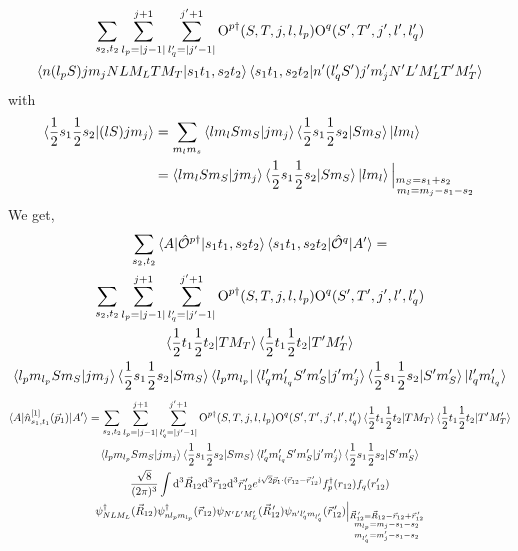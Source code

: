 \documentclass[10pt]{article}
\begin{document}
\begin{multline*}
	 \sum_{s_2,t_2} \sum_{l_p = |j-1|}^{j+1} \sum_{l_q' = |j' - 1|}^{j'+1} \text{O}^{p \dagger}(S,T,j,l,l_p) \text{O}^{q}(S',T',j',l',l_q') \\
	 \braket{ n (l_p S) j m_j N L M_L T M_T | s_1 t_1, s_2 t_2} \braket{ s_1 t_1, s_2 t_2 | n' (l_q' S') j' m_j' N' L' M_L' T' M_T'} \\
\end{multline*}
with
\begin{align*}
	\braket{ \frac{1}{2} s_1 \frac{1}{2} s_2 | (l S) j m_j} &= \sum_{m_l m_s} \braket{ l m_l S m_S | j m_j } \braket{   \frac{1}{2} s_1 \frac{1}{2} s_2 | S m_S} \ket{ l m_l} \\
	&= \braket{ l m_l S m_S | j m_j } \braket{   \frac{1}{2} s_1 \frac{1}{2} s_2 | S m_S} \ket{ l m_l} \Big|_{ \substack{ m_S = s_1 + s_2 \phantom{ + m_j} \\ m_l = m_j - s_1 - s_2} }
\end{align*}
We get,
\begin{multline*}
\sum_{s_2,t_2} \braket{ A | \hat{\mathcal{O}}^{p\dagger} | s_1 t_1, s_2 t_2} \braket{ s_1 t_1, s_2 t_2 | \hat{ \mathcal{O}}^{q} | A'} = \\
 \sum_{s_2,t_2} \sum_{l_p = |j-1|}^{j+1} \sum_{l_q' = |j' - 1|}^{j'+1} \text{O}^{p \dagger}(S,T,j,l,l_p) \text{O}^{q}(S',T',j',l',l_q') \\
 	\braket{ \frac{1}{2} t_1 \frac{1}{2} t_2 | T M_T } \braket{ \frac{1}{2} t_1 \frac{1}{2} t_2 | T' M_T'} \\
	\braket{ l_p  m_{l_p} S m_S | j m_j } \braket{   \frac{1}{2} s_1 \frac{1}{2} s_2 | S m_S} \bra{ l_p m_{l_p} }
	\braket{ l_q' m_{l_q}' S' m_S' | j' m_j' } \braket{   \frac{1}{2} s_1 \frac{1}{2} s_2 | S' m_S'} \ket{ l_q' m_{l_q}'}
\end{multline*}
\begin{multline*}
	\braket{ A | \hat{n}_{s_1,t_1}^{[1]}(\vec{p}_1) | A'} =  \sum_{s_2,t_2} \sum_{l_p = |j-1|}^{j+1} \sum_{l_q' = |j' - 1|}^{j'+1} \text{O}^{p\dagger}(S,T,j,l,l_p) \text{O}^{q}(S',T',j',l',l_q') \braket{ \frac{1}{2} t_1 \frac{1}{2} t_2 | T M_T } \braket{ \frac{1}{2} t_1 \frac{1}{2} t_2 | T' M_T'} \\
	\braket{ l_p  m_{l_p} S m_S | j m_j } \braket{   \frac{1}{2} s_1 \frac{1}{2} s_2 | S m_S} 
	\braket{ l_q' m_{l_q}' S' m_S' | j' m_j' } \braket{   \frac{1}{2} s_1 \frac{1}{2} s_2 | S' m_S'} \\
 \frac{\sqrt{8}}{(2 \pi)^{3}} \int \text{d}^{3} \vec{R}_{12} \text{d}^{3} \vec{r}_{12} \text{d}^{3} \vec{r}_{12}^{\, \prime}  e^{ i \sqrt{2} \vec{p}_{1} \cdot ( \vec{r}_{12} - \vec{r}_{12}^{\, \prime}) } f_{p}^{\dagger}(r_{12}) f_{q}(r_{12}') \\
   \psi_{N L M_L}^{\dagger}(\vec{R}_{12}) \psi_{ n l_p m_{l_p} }^{\dagger}(\vec{r}_{12}) \psi_{N' L' M_L'}(\vec{R}_{12}^{\, \prime}) \psi_{ n' l_q' m_{l_q'} } (\vec{r}_{12}^{\, \prime}) \Big|_{ \substack{ \vec{R}_{12}^{\, \prime} = \vec{R}_{12} - \vec{r}_{12}  + \vec{r}_{12}^{\, \prime} \\ m_{l_p} = m_j - s_1 - s_2 \\ m_{l_q'} = m_j' - s_1 - s_2 }}
\end{multline*}
\end{document}
